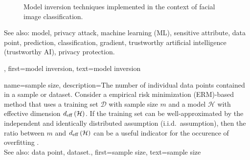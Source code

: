 {{{\begin{figure}[H]
\begin{center}
			\end{center} 
			\caption{Model inversion techniques implemented in the context of facial image classification. \label{fig_model_inv_dict}}
		\end{figure}
  		See also: model, privacy attack, machine learning (ML), sensitive attribute, data point, prediction, classification, gradient, trustworthy artificial intelligence (trustworthy AI), privacy protection. },
	first={model inversion},
  	text={model inversion}
}



{name={sample size},
	description={The number of individual data points contained in a 
	    sample or dataset. Consider a empirical risk minimization (ERM)-based method that uses a 
		training set $\mathcal{D}$ with sample size $m$ 
		and a model $\mathcal{H}$ with effective dimension $d_{\rm eff} \left( \mathcal{H} \right)$. If the training set can 
		be well-approximated by the independent and identically distributed assumption (i.i.d.\ assumption), then the ratio between $m$ 
		and $d_{\rm eff} \left( \mathcal{H} \right)$ can be a useful indicator for the occurence of overfitting \cite[Ch. 6]{MLBasics}.
				\\
		See also: data point, dataset.},
	first={sample size},
	text={sample size}
}

}
